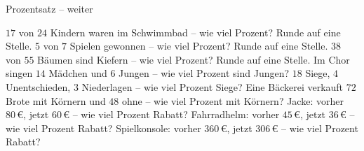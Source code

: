 \begin{aufgabe}{Prozentsatz – weiter}
\begin{teile}
\teil $17$ von $24$ Kindern waren im Schwimmbad – wie viel Prozent? Runde auf eine Stelle. \leerfeld[\%]
\teil $5$ von $7$ Spielen gewonnen – wie viel Prozent? Runde auf eine Stelle. \leerfeld[\%]
\teil $38$ von $55$ Bäumen sind Kiefern – wie viel Prozent? Runde auf eine Stelle. \leerfeld[\%]
\teil Im Chor singen $14$ Mädchen und $6$ Jungen – wie viel Prozent sind Jungen? \leerfeld[\%]
\teil $18$ Siege, $4$ Unentschieden, $3$ Niederlagen – wie viel Prozent Siege? \leerfeld[\%]
\teil Eine Bäckerei verkauft $72$ Brote mit Körnern und $48$ ohne – wie viel Prozent mit Körnern? \leerfeld[\%]
\teil Jacke: vorher $80\,€$, jetzt $60\,€$ – wie viel Prozent Rabatt? \leerfeld[\%]
\teil Fahrradhelm: vorher $45\,€$, jetzt $36\,€$ – wie viel Prozent Rabatt? \leerfeld[\%]
\teil Spielkonsole: vorher $360\,€$, jetzt $306\,€$ – wie viel Prozent Rabatt? \leerfeld[\%]
\end{teile}
\end{aufgabe}

